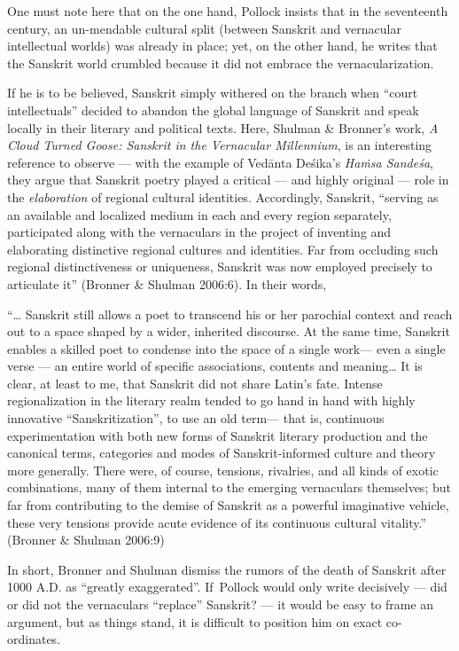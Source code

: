 One must note here that on the one hand, Pollock insists that in the seventeenth century, an un-mendable cultural split (between Sanskrit and vernacular intellectual worlds) was already in place; yet, on the other hand, he writes that the Sanskrit world crumbled because it did not embrace the vernacularization.

If he is to be believed, Sanskrit simply withered on the branch when “court intellectuals” decided to abandon the global language of Sanskrit and speak locally in their literary and political texts. Here, Shulman \& Bronner’s work, {\sl A Cloud Turned Goose: Sanskrit in the Vernacular Millennium}, is an interesting reference to observe — with the example of Vedānta Deśika’s {\sl Haṁsa Sandeśa}, they argue that Sanskrit poetry played a critical — and highly original — role in the {\sl elaboration} of regional cultural identities. Accordingly, Sanskrit, “serving as an available and localized medium in each and every region separately, participated along with the vernaculars in the project of inventing and elaborating distinctive regional cultures and identities. Far from occluding such regional distinctiveness or uniqueness, Sanskrit was now employed precisely to articulate it” (Bronner \& Shulman 2006:6). In their words,
\begin{myquote}
“… Sanskrit still allows a poet to transcend his or her parochial context and reach out to a space shaped by a wider, inherited discourse. At the same time, Sanskrit enables a skilled poet to condense into the space of a single work— even a single verse — an entire world of specific associations, contents and meaning… It is clear, at least to me, that Sanskrit did not share Latin’s fate. Intense regionalization in the literary realm tended to go hand in hand with highly innovative “Sanskritization”, to use an old term— that is, continuous experimentation with both new forms of Sanskrit literary production and the canonical terms, categories and modes of Sanskrit-informed culture and theory more generally. There were, of course, tensions, rivalries, and all kinds of exotic combinations, many of them internal to the emerging vernaculars themselves; but far from contributing to the demise of Sanskrit as a powerful imaginative vehicle, these very tensions provide acute evidence of its continuous cultural vitality.”	
\hfill{(Bronner \& Shulman 2006:9)}
\end{myquote}

In short, Bronner and Shulman dismiss the rumors of the death of Sanskrit after 1000 A.D. as “greatly exaggerated”. If\, Pollock would only write decisively — did or did not the vernaculars “replace” Sanskrit? — it would be easy to frame an argument, but as things stand, it is difficult to position him on exact co-ordinates. 

